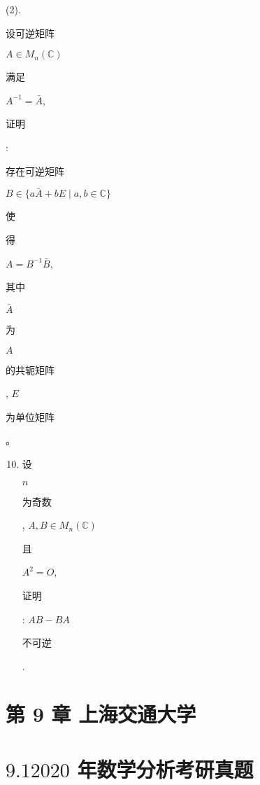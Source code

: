 \documentclass[10pt]{article}
\begin{document}
(2). \begin{CJK}{UTF8}{mj}设可逆矩阵\end{CJK} $A \in M_{n}(\mathbb{C})$ \begin{CJK}{UTF8}{mj}满足\end{CJK} $A^{-1}=\bar{A}$, \begin{CJK}{UTF8}{mj}证明\end{CJK}: \begin{CJK}{UTF8}{mj}存在可逆矩阵\end{CJK} $B \in\{a \bar{A}+b E \mid a, b \in \mathbb{C}\}$ \begin{CJK}{UTF8}{mj}使\end{CJK} \begin{CJK}{UTF8}{mj}得\end{CJK} $A=B^{-1} \bar{B}$, \begin{CJK}{UTF8}{mj}其中\end{CJK} $\bar{A}$ \begin{CJK}{UTF8}{mj}为\end{CJK} $A$ \begin{CJK}{UTF8}{mj}的共轭矩阵\end{CJK}, $E$ \begin{CJK}{UTF8}{mj}为单位矩阵\end{CJK}。

\begin{enumerate}
  \setcounter{enumi}{9}
  \item \begin{CJK}{UTF8}{mj}设\end{CJK} $n$ \begin{CJK}{UTF8}{mj}为奇数\end{CJK}, $A, B \in M_{n}(\mathbb{C})$ \begin{CJK}{UTF8}{mj}且\end{CJK} $A^{2}=O$, \begin{CJK}{UTF8}{mj}证明\end{CJK}: $A B-B A$ \begin{CJK}{UTF8}{mj}不可逆\end{CJK}.
\end{enumerate}
\section{第 9 章 上海交通大学}
\section{$9.12020$ 年数学分析考研真题}
\end{document}
